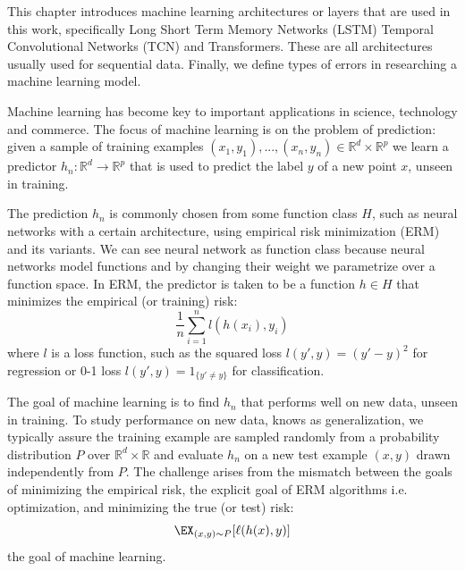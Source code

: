 

This chapter introduces machine learning architectures or layers that are used in this work, specifically Long Short Term Memory Networks (LSTM) Temporal Convolutional Networks (TCN) and Transformers. These are all architectures usually used for sequential data. Finally, we define types of errors in researching a machine learning model. 

\hfill \break

Machine learning has become key to important applications in science, technology and commerce. The focus of machine learning is on the problem of prediction: given a sample of training examples $(x_1,y_1),...,(x_n,y_n) \in \mathbb{R}^d \times \mathbb{R}^p$ we learn a predictor $h_n: \mathbb{R}^d \rightarrow \mathbb{R}^p$ that is used to predict the label $y$ of a new point $x$, unseen in training.

\hfill \break

The prediction $h_n$ is commonly chosen from some function class $H$, such as neural networks with a certain architecture, using empirical risk minimization (ERM) and its variants. We can see neural network as function class because neural networks model functions and by changing their weight we parametrize over a function space.  In ERM, the predictor is taken to be a function $h \in H$ that minimizes the empirical (or training) risk: $$\frac{1}{n} \sum_{i=1}^n l(h(x_i),y_i)$$
where $l$ is a loss function, such as the squared loss $l(y',y)=(y'-y)^2$ for regression or 0-1 loss $l(y',y)=1_{\{y' \neq y\}}$ for classification.

\hfill \break

The goal of machine learning is to find $h_n$ that performs well on new data, unseen in training. To study performance on new data, knows as generalization, we typically assure the training example are sampled randomly from a probability distribution $P$ over $\mathbb{R}^d \times \mathbb{R}$ and evaluate $h_n$ on a new test example $(x,y)$ drawn independently from $P$. The challenge arises from the mismatch between the goals of minimizing the empirical risk, the explicit goal of ERM algorithms i.e. optimization, and minimizing the true (or test) risk:
$$\EX_{(x,y) \sim P}[\ell (h(x),y)]$$
the goal of machine learning.

